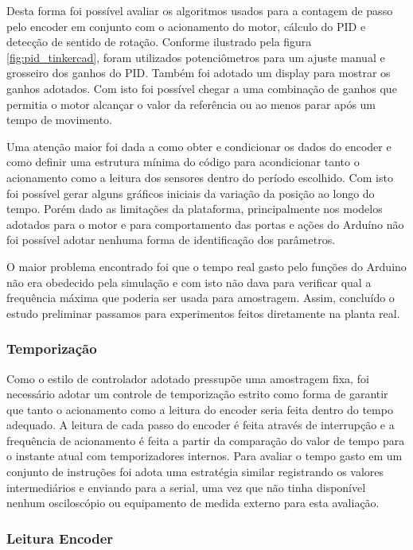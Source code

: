 \documentclass[a4paper,11pt]{article}
\begin{document}
Desta forma foi possível avaliar os algoritmos usados para a contagem de passo pelo encoder em conjunto com o acionamento do motor, cálculo do PID e detecção de sentido de rotação. Conforme ilustrado pela figura \ref{fig:pid_tinkercad}, foram utilizados potenciômetros para um ajuste manual e grosseiro dos ganhos do PID. Também foi adotado um display para mostrar os ganhos adotados. Com isto foi possível chegar a uma combinação de ganhos que permitia o motor alcançar o valor da referência ou ao menos parar após um tempo de movimento.

Uma atenção maior foi dada a como obter e condicionar os dados do encoder e como definir uma estrutura mínima do código para acondicionar tanto o acionamento como a leitura dos sensores dentro do período escolhido. Com isto foi possível gerar alguns gráficos iniciais da variação da posição ao longo do tempo. Porém dado as limitações da plataforma, principalmente nos modelos adotados para o motor e para comportamento das portas e ações do Arduíno não foi possível adotar nenhuma forma de identificação dos parâmetros.

O maior problema encontrado foi que o tempo real gasto pelo funções do Arduino não era obedecido pela simulação e com isto não dava para verificar qual a frequência máxima que poderia ser usada para amostragem. Assim, concluído o estudo preliminar passamos para experimentos feitos diretamente na planta real.

\subsubsection{Temporização}

Como o estilo de controlador adotado pressupõe uma amostragem fixa, foi necessário adotar um controle de temporização estrito como forma de garantir que tanto o acionamento como a leitura do encoder seria feita dentro do tempo adequado. A leitura de cada passo do encoder é feita através de interrupção e a frequência de acionamento é feita a partir da comparação do valor de tempo para o instante atual com temporizadores internos. Para avaliar o tempo gasto em um conjunto de instruções foi adota uma estratégia similar registrando os valores intermediários e enviando para a serial, uma vez que não tinha disponível nenhum osciloscópio ou equipamento de medida externo para esta avaliação.

\subsubsection{Leitura Encoder}
\end{document}
